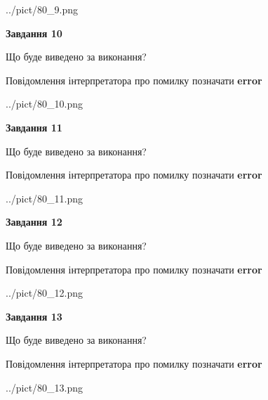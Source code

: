 \documentclass[11pt, ukrainian]{article}
\begin{document}
{\begin {large}
\begin{center}
	{../pict/80_9.png}
\end{center}
\newpage

{\begin {center}\textbf{Завдання 10}\end {center}}\par
Що буде виведено за виконання? \par
Повідомлення інтерпретатора про помилку позначати \textbf{error}

\begin{center}
	{../pict/80_10.png}
\end{center}
\newpage

{\begin {center}\textbf{Завдання 11}\end {center}}\par
Що буде виведено за виконання? \par
Повідомлення інтерпретатора про помилку позначати \textbf{error}

\begin{center}
	{../pict/80_11.png}
\end{center}
\newpage

{\begin {center}\textbf{Завдання 12}\end {center}}\par
Що буде виведено за виконання? \par
Повідомлення інтерпретатора про помилку позначати \textbf{error}

\begin{center}
	{../pict/80_12.png}
\end{center}
\newpage

{\begin {center}\textbf{Завдання 13}\end {center}}\par
Що буде виведено за виконання? \par
Повідомлення інтерпретатора про помилку позначати \textbf{error}

\begin{center}
	{../pict/80_13.png}
\end{center}
\newpage


\end{large}}
\end{document}

